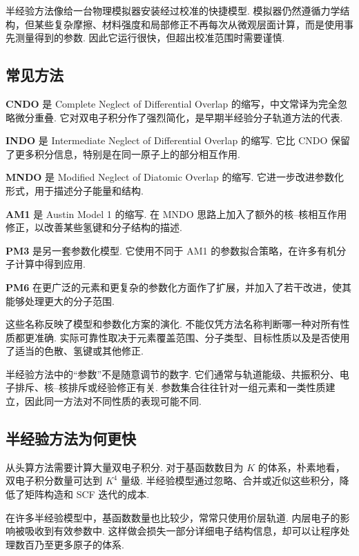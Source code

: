 \documentclass[UTF8,11pt,a4paper,openany]{ctexbook}
\newcommand{\term}[1]{\textbf{#1}}
\begin{document}
\begin{analogybox}
半经验方法像给一台物理模拟器安装经过校准的快捷模型. 模拟器仍然遵循力学结构，但某些复杂摩擦、材料强度和局部修正不再每次从微观层面计算，而是使用事先测量得到的参数. 因此它运行很快，但超出校准范围时需要谨慎. 
\end{analogybox}

\subsection{常见方法}

\term{CNDO} 是 Complete Neglect of Differential Overlap 的缩写，中文常译为完全忽略微分重叠. 它对双电子积分作了强烈简化，是早期半经验分子轨道方法的代表. 

\term{INDO} 是 Intermediate Neglect of Differential Overlap 的缩写. 它比 CNDO 保留了更多积分信息，特别是在同一原子上的部分相互作用. 

\term{MNDO} 是 Modified Neglect of Diatomic Overlap 的缩写. 它进一步改进参数化形式，用于描述分子能量和结构. 

\term{AM1} 是 Austin Model 1 的缩写. 在 MNDO 思路上加入了额外的核--核相互作用修正，以改善某些氢键和分子结构的描述. 

\term{PM3} 是另一套参数化模型. 它使用不同于 AM1 的参数拟合策略，在许多有机分子计算中得到应用. 

\term{PM6} 在更广泛的元素和更复杂的参数化方面作了扩展，并加入了若干改进，使其能够处理更大的分子范围. 

这些名称反映了模型和参数化方案的演化. 不能仅凭方法名称判断哪一种对所有性质都更准确. 实际可靠性取决于元素覆盖范围、分子类型、目标性质以及是否使用了适当的色散、氢键或其他修正. 

\begin{notationbox}
半经验方法中的“参数”不是随意调节的数字. 它们通常与轨道能级、共振积分、电子排斥、核--核排斥或经验修正有关. 参数集合往往针对一组元素和一类性质建立，因此同一方法对不同性质的表现可能不同. 
\end{notationbox}

\subsection{半经验方法为何更快}

从头算方法需要计算大量双电子积分. 对于基函数数目为 $K$ 的体系，朴素地看，双电子积分数量可达到 $K^4$ 量级. 半经验模型通过忽略、合并或近似这些积分，降低了矩阵构造和 SCF 迭代的成本. 

在许多半经验模型中，基函数数量也比较少，常常只使用价层轨道. 内层电子的影响被吸收到有效参数中. 这样做会损失一部分详细电子结构信息，却可以让程序处理数百乃至更多原子的体系. 
\end{document}
